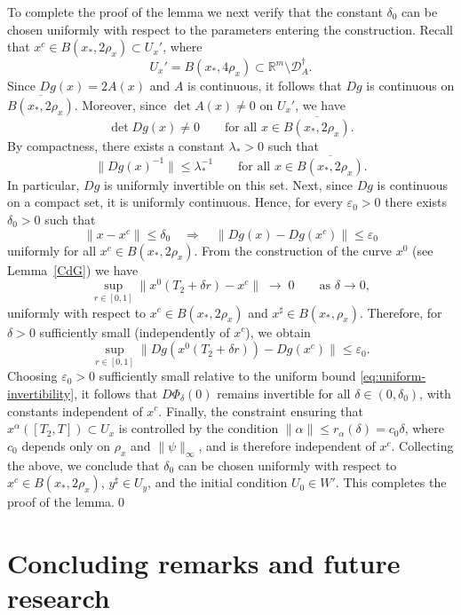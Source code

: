 \documentclass[11pt, a4paper,leqno]{amsart}
\theoremstyle{definition}
\numberwithin{equation}{section}
\newcommand{\R}{\mathbb R}
\begin{document}
To complete the proof of the lemma we next verify that the constant $\delta_0$ can be chosen uniformly
with respect to the parameters entering the construction. Recall that $x^c\in B(x_\ast,2\rho_x)\subset U_x'$, where
\[
U_x'=B(x_\ast,4\rho_x)\subset\R^m\setminus\mathcal D_A^\dagger.
\]
Since $Dg(x)=2A(x)$ and $A$ is continuous, it follows that $Dg$ is continuous
on $\overline{B(x_\ast,2\rho_x)}$. Moreover, since
$\det A(x)\neq 0$ on $U_x'$, we have
\[
\det Dg(x)\neq 0
\qquad \text{for all } x\in \overline{B(x_\ast,2\rho_x)}.
\]
By compactness, there exists a constant $\lambda_\ast>0$ such that
\begin{equation}\label{eq:uniform-invertibility}
\|Dg(x)^{-1}\|\le \lambda_\ast^{-1}
\qquad \text{for all } x\in \overline{B(x_\ast,2\rho_x)}.
\end{equation}
In particular, $Dg$ is uniformly invertible on this set. Next, since $Dg$ is continuous on a compact set, it is uniformly continuous.
Hence, for every $\varepsilon_0>0$ there exists $\delta_0>0$ such that
\[
\|x-x^c\|\le \delta_0
\quad\Longrightarrow\quad
\|Dg(x)-Dg(x^c)\|\le \varepsilon_0
\]
uniformly for all $x^c\in B(x_\ast,2\rho_x)$. From the construction of the curve $x^0$ (see Lemma~\ref{CdG}) we have
\[
\sup_{r\in[0,1]}
\|x^0(T_2+\delta r)-x^c\|\;\longrightarrow\;0
\qquad \text{as } \delta\to 0,
\]
uniformly with respect to $x^c\in B(x_\ast,2\rho_x)$ and
$x^\sharp\in B(x_\ast,\rho_x)$. Therefore, for $\delta>0$ sufficiently small (independently of $x^c$),
we obtain
\[
\sup_{r\in[0,1]}
\|Dg(x^0(T_2+\delta r))-Dg(x^c)\|
\le \varepsilon_0.
\]
Choosing $\varepsilon_0>0$ sufficiently small relative to the
uniform bound \eqref{eq:uniform-invertibility}, it follows that
$D\Phi_\delta(0)$ remains invertible for all $\delta\in(0,\delta_0)$,
with constants independent of $x^c$. Finally, the constraint ensuring that
$x^\alpha([T_2,T])\subset U_x$ is controlled by the condition
$\|\alpha\|\le r_\alpha(\delta)=c_0\delta$, where $c_0$ depends only on
$\rho_x$ and $\|\psi\|_\infty$, and is therefore independent of $x^c$. Collecting the above, we conclude that $\delta_0$ can be chosen
uniformly with respect to $x^c\in B(x_\ast,2\rho_x)$,
$y^\sharp\in U_y$, and the initial condition $U_0\in W'$. This completes the proof of the lemma.\qed













\section{Concluding remarks and future research}\label{Conc}
\end{document}
